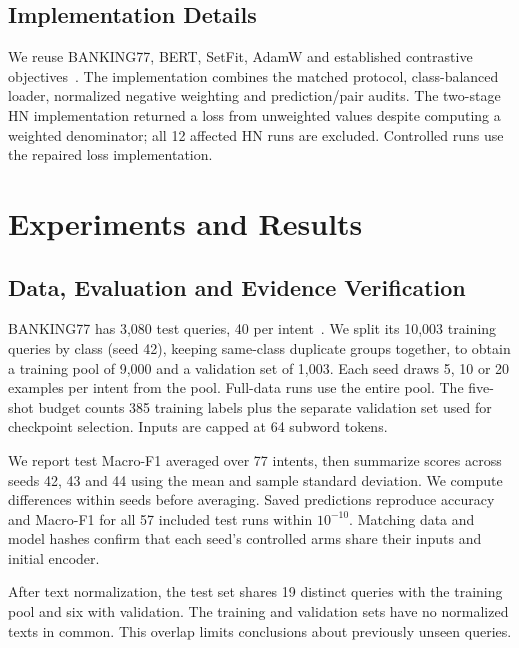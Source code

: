 \documentclass[runningheads]{llncs}
\begin{document}
\subsection{Implementation Details}
We reuse BANKING77, BERT, SetFit, AdamW and established contrastive objectives~\cite{banking,bert,setfit,supcon,gunel}. The implementation combines the matched protocol, class-balanced loader, normalized negative weighting and prediction/pair audits. The two-stage HN implementation returned a loss from unweighted values despite computing a weighted denominator; all 12 affected HN runs are excluded. Controlled runs use the repaired loss implementation.

\section{Experiments and Results}
\subsection{Data, Evaluation and Evidence Verification}
BANKING77 has 3,080 test queries, 40 per intent~\cite{banking}. We split its 10,003 training queries by class (seed 42), keeping same-class duplicate groups together, to obtain a training pool of 9,000 and a validation set of 1,003. Each seed draws 5, 10 or 20 examples per intent from the pool. Full-data runs use the entire pool. The five-shot budget counts 385 training labels plus the separate validation set used for checkpoint selection. Inputs are capped at 64 subword tokens.

We report test Macro-F1 averaged over 77 intents, then summarize scores across seeds 42, 43 and 44 using the mean and sample standard deviation. We compute differences within seeds before averaging. Saved predictions reproduce accuracy and Macro-F1 for all 57 included test runs within $10^{-10}$. Matching data and model hashes confirm that each seed's controlled arms share their inputs and initial encoder.

After text normalization, the test set shares 19 distinct queries with the training pool and six with validation. The training and validation sets have no normalized texts in common. This overlap limits conclusions about previously unseen queries.
\end{document}
